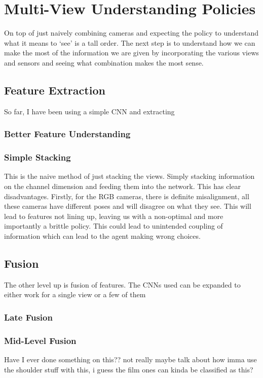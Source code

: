 \section{Multi-View Understanding Policies}
On top of just naively combining cameras and expecting the policy to understand what it means to `see' is a tall order. The next step is to understand how we can make the most of the information we are given by incorporating the various views and sensors and seeing what combination makes the most sense.

\subsection{Feature Extraction}
So far, I have been using a simple CNN and extracting 

\subsubsection{Better Feature Understanding}


\subsubsection{Simple Stacking}
This is the naive method of just stacking the views. Simply stacking information on the channel dimension and feeding them into the network. This has clear disadvantages. Firstly, for the RGB cameras, there is definite misalignment, all these cameras have different poses and will disagree on what they see. This will lead to features not lining up, leaving us with a non-optimal and more importantly a brittle policy. This could lead to unintended coupling of information which can lead to the agent making wrong choices.

\subsection{Fusion}
The other level up is fusion of features. The CNNs used can be expanded to either work for a single view or a few of them

\subsubsection{Late Fusion}

\subsubsection{Mid-Level Fusion}
Have I ever done something on this?? not really maybe talk about how imma use the shoulder stuff with this, i guess the film ones can kinda be classified as this?

